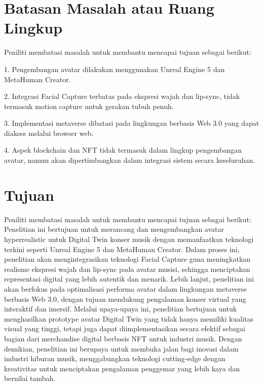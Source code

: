 \section{Batasan Masalah atau Ruang Lingkup}

Peniliti membatasi masalah untuk membantu mencapai tujuan sebagai berikut:
\\

\begin{enumarate}
\item 1. Pengembangan avatar dilakukan menggunakan Unreal Engine 5 dan MetaHuman Creator.
\item 2. Integrasi Facial Capture terbatas pada ekspresi wajah dan lip-sync, tidak termasuk motion capture untuk gerakan tubuh penuh.
\item 3. Implementasi metaverse dibatasi pada lingkungan berbasis Web 3.0 yang dapat diakses melalui browser web.
\item 4. Aspek blockchain dan NFT tidak termasuk dalam lingkup pengembangan avatar, namun akan dipertimbangkan dalam integrasi sistem secara keseluruhan.
\end{enumarate}

\section{Tujuan}

Peniliti membatasi masalah untuk membantu mencapai tujuan sebagai berikut:
\\

Penelitian ini bertujuan untuk merancang dan mengembangkan avatar hyperrealistic untuk Digital Twin konser musik dengan memanfaatkan
teknologi terkini seperti Unreal Engine 5 dan MetaHuman Creator. Dalam proses ini, penelitian akan mengintegrasikan teknologi Facial
Capture guna meningkatkan realisme ekspresi wajah dan lip-sync pada avatar musisi, sehingga menciptakan representasi digital yang 
lebih autentik dan menarik. Lebih lanjut, penelitian ini akan berfokus pada optimalisasi performa avatar dalam lingkungan metaverse 
berbasis Web 3.0, dengan tujuan mendukung pengalaman konser virtual yang interaktif dan imersif. Melalui upaya-upaya ini, penelitian 
bertujuan untuk menghasilkan prototype avatar Digital Twin yang tidak hanya memiliki kualitas visual yang tinggi, tetapi juga dapat 
diimplementasikan secara efektif sebagai bagian dari merchandise digital berbasis NFT untuk industri musik. Dengan demikian, 
penelitian ini berupaya untuk membuka jalan bagi inovasi dalam industri hiburan musik, menggabungkan teknologi cutting-edge dengan 
kreativitas untuk menciptakan pengalaman penggemar yang lebih kaya dan bernilai tambah.

